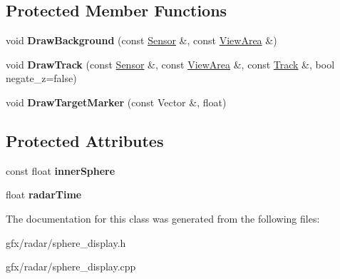 \subsection*{Protected Member Functions}
\begin{DoxyCompactItemize}
\item 
void {\bfseries Draw\+Background} (const \hyperlink{classRadar_1_1Sensor}{Sensor} \&, const \hyperlink{structRadar_1_1ViewArea}{View\+Area} \&)\hypertarget{classRadar_1_1SphereDisplay_a38ee75c8a0d6e1976190c8448e1d6879}{}\label{classRadar_1_1SphereDisplay_a38ee75c8a0d6e1976190c8448e1d6879}

\item 
void {\bfseries Draw\+Track} (const \hyperlink{classRadar_1_1Sensor}{Sensor} \&, const \hyperlink{structRadar_1_1ViewArea}{View\+Area} \&, const \hyperlink{classRadar_1_1Track}{Track} \&, bool negate\+\_\+z=false)\hypertarget{classRadar_1_1SphereDisplay_adf31536f99c93517f8824de91882dcbf}{}\label{classRadar_1_1SphereDisplay_adf31536f99c93517f8824de91882dcbf}

\item 
void {\bfseries Draw\+Target\+Marker} (const Vector \&, float)\hypertarget{classRadar_1_1SphereDisplay_a1b58b2abc5fcc37d9e3c65a9c7e9c498}{}\label{classRadar_1_1SphereDisplay_a1b58b2abc5fcc37d9e3c65a9c7e9c498}

\end{DoxyCompactItemize}
\subsection*{Protected Attributes}
\begin{DoxyCompactItemize}
\item 
const float {\bfseries inner\+Sphere}\hypertarget{classRadar_1_1SphereDisplay_ade2fbd4c17ab99eefe01ecb2339fe6cc}{}\label{classRadar_1_1SphereDisplay_ade2fbd4c17ab99eefe01ecb2339fe6cc}

\item 
float {\bfseries radar\+Time}\hypertarget{classRadar_1_1SphereDisplay_a00cc237bd622a80826585ac9f9bf08a4}{}\label{classRadar_1_1SphereDisplay_a00cc237bd622a80826585ac9f9bf08a4}

\end{DoxyCompactItemize}


The documentation for this class was generated from the following files\+:\begin{DoxyCompactItemize}
\item 
gfx/radar/sphere\+\_\+display.\+h\item 
gfx/radar/sphere\+\_\+display.\+cpp\end{DoxyCompactItemize}
